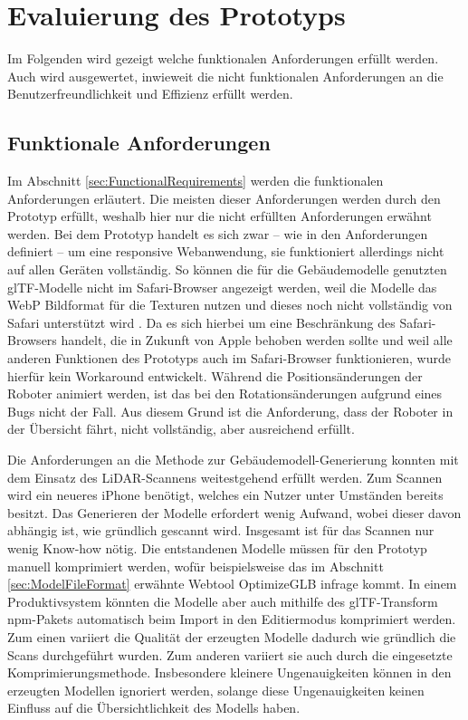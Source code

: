 \newpage
\section{Evaluierung des Prototyps}
Im Folgenden wird gezeigt welche funktionalen Anforderungen erfüllt werden. Auch wird ausgewertet, inwieweit die nicht funktionalen Anforderungen an die Benutzerfreundlichkeit und Effizienz erfüllt werden.

\subsection{Funktionale Anforderungen}\label{sec:EvaluationFunctionalRequirements}
Im Abschnitt \ref{sec:FunctionalRequirements} werden die funktionalen Anforderungen erläutert. Die meisten dieser Anforderungen werden durch den Prototyp erfüllt, weshalb hier nur die nicht erfüllten Anforderungen erwähnt werden. Bei dem Prototyp handelt es sich zwar – wie in den Anforderungen definiert – um eine responsive Webanwendung, sie funktioniert allerdings nicht auf allen Geräten vollständig. So können die für die Gebäudemodelle genutzten \ac{glTF}-Modelle nicht im Safari-Browser angezeigt werden, weil die Modelle das \ac{WebP} Bildformat für die Texturen nutzen und dieses noch nicht vollständig von Safari unterstützt wird \cite{CanIUseWebP}. Da es sich hierbei um eine Beschränkung des Safari-Browsers handelt, die in Zukunft von Apple behoben werden sollte und weil alle anderen Funktionen des Prototyps auch im Safari-Browser funktionieren, wurde hierfür kein Workaround entwickelt. Während die Positionsänderungen der Roboter animiert werden, ist das bei den Rotationsänderungen aufgrund eines Bugs nicht der Fall. Aus diesem Grund ist die Anforderung, dass der Roboter in der Übersicht fährt, nicht vollständig, aber ausreichend erfüllt.

Die Anforderungen an die Methode zur Gebäudemodell-Generierung konnten mit dem Einsatz des \ac{LiDAR}-Scannens weitestgehend erfüllt werden. Zum Scannen wird ein neueres iPhone benötigt, welches ein Nutzer unter Umständen bereits besitzt. Das Generieren der Modelle erfordert wenig Aufwand, wobei dieser davon abhängig ist, wie gründlich gescannt wird. Insgesamt ist für das Scannen nur wenig Know-how nötig. Die entstandenen Modelle müssen für den Prototyp manuell komprimiert werden, wofür beispielsweise das im Abschnitt \ref{sec:ModelFileFormat} erwähnte Webtool OptimizeGLB infrage kommt. In einem Produktivsystem könnten die Modelle aber auch mithilfe des \ac{glTF}-Transform \ac{npm}-Pakets \cite{glTF-Transform} automatisch beim Import in den Editiermodus komprimiert werden. Zum einen variiert die Qualität der erzeugten Modelle dadurch wie gründlich die Scans durchgeführt wurden. Zum anderen variiert sie auch durch die eingesetzte Komprimierungsmethode. Insbesondere kleinere Ungenauigkeiten können in den erzeugten Modellen ignoriert werden, solange diese Ungenauigkeiten keinen Einfluss auf die Übersichtlichkeit des Modells haben.

